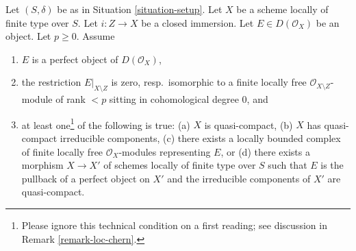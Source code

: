 \begin{situation}
\label{situation-loc-chern}
Let $(S, \delta)$ be as in Situation \ref{situation-setup}. Let $X$ be a scheme
locally of finite type over $S$. Let $i : Z \to X$ be a closed immersion.
Let $E \in D(\mathcal{O}_X)$ be an object. Let $p \geq 0$. Assume
\begin{enumerate}
\item $E$ is a perfect object of $D(\mathcal{O}_X)$,
\item the restriction $E|_{X \setminus Z}$ is zero, resp.\ isomorphic to a
finite locally free $\mathcal{O}_{X \setminus Z}$-module of rank $< p$
sitting in cohomological degree $0$, and
\item at least one\footnote{Please ignore this technical condition on a
first reading; see discussion in Remark \ref{remark-loc-chern}.}
of the following is true:
(a) $X$ is quasi-compact,
(b) $X$ has quasi-compact irreducible components,
(c) there exists a locally bounded complex of finite locally free
$\mathcal{O}_X$-modules representing $E$, or
(d) there exists a morphism $X \to X'$ of schemes locally of finite type
over $S$ such that $E$ is the pullback of a perfect object on $X'$ and
the irreducible components of $X'$ are quasi-compact.
\end{enumerate}
\end{situation}